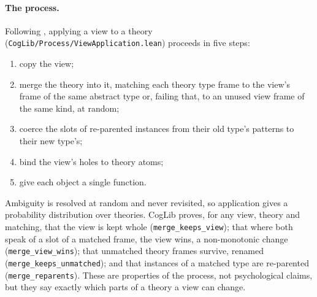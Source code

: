 \documentclass[11pt]{article}
\newcommand{\code}[1]{\texttt{#1}}
\newcommand{\lean}[1]{\texttt{#1}}
\begin{document}
\paragraph{The process.} Following \citet{shrager1987}, applying a view to a theory (\code{CogLib/Process/ViewApplication.lean}) proceeds in five steps:
\begin{enumerate}
  \item copy the view;
  \item merge the theory into it, matching each theory type frame to the view's frame of the same abstract type or, failing that, to an unused view frame of the same kind, at random;
  \item coerce the slots of re-parented instances from their old type's patterns to their new type's;
  \item bind the view's holes to theory atoms;
  \item give each object a single function.
\end{enumerate}
Ambiguity is resolved at random and never revisited, so application gives a probability distribution over theories. CogLib proves, for any view, theory and matching, that the view is kept whole (\lean{merge\_keeps\_view}); that where both speak of a slot of a matched frame, the view wins, a non-monotonic change (\lean{merge\_view\_wins}); that unmatched theory frames survive, renamed (\lean{merge\_keeps\_unmatched}); and that instances of a matched type are re-parented (\lean{merge\_reparents}). These are properties of the process, not psychological claims, but they say exactly which parts of a theory a view can change.
\end{document}

